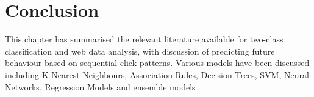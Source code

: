 \section{Conclusion}\label{sotaConc}
This chapter has summarised the relevant literature available for two-class classification and web data analysis, with discussion of predicting future behaviour based on sequential click patterns. Various models have been discussed including K-Nearest Neighbours, Association Rules, Decision Trees, SVM, Neural Networks, Regression Models and ensemble models

